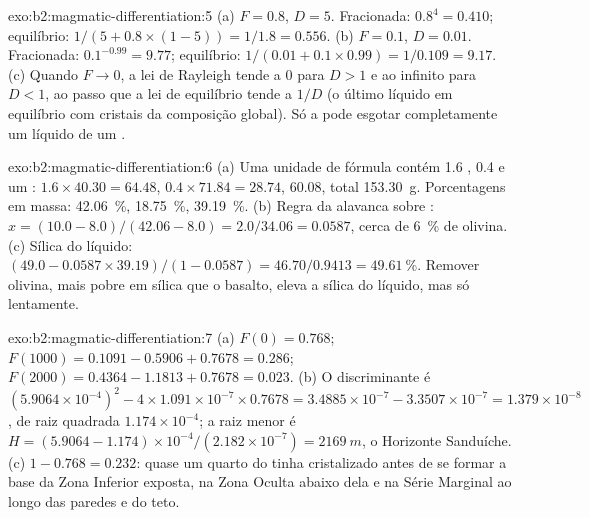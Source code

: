 \begin{solution}{exo:b2:magmatic-differentiation:5}
(a) $F = 0.8$, $D = 5$. Fracionada: $0.8^{4} = 0.410$; equilíbrio:
$1/(5 + 0.8\times(1 - 5)) = 1/1.8 = 0.556$. (b) $F = 0.1$, $D = 0.01$. Fracionada:
$0.1^{-0.99} = 9.77$; equilíbrio: $1/(0.01 + 0.1\times0.99) = 1/0.109 = 9.17$.
(c) Quando $F \to 0$, a lei de Rayleigh tende a $0$ para $D > 1$ e ao infinito para
$D < 1$, ao passo que a lei de equilíbrio tende a $1/D$ (o último líquido em equilíbrio
com cristais da composição global). Só a  pode esgotar completamente um
líquido de um .
\end{solution}

\begin{solution}{exo:b2:magmatic-differentiation:6}
(a) Uma unidade de fórmula contém 1.6 , 0.4  e um : $1.6\times
40.30 = 64.48$, $0.4\times71.84 = 28.74$, 60.08, total \qty{153.30}{g}. Porcentagens
em massa:  \qty{42.06}{\percent},  \qty{18.75}{\percent},
 \qty{39.19}{\percent}. (b) Regra da alavanca sobre : $x = (10.0 - 8.0)/(42.06
- 8.0) = 2.0/34.06 = 0.0587$, cerca de \qty{6}{\percent} de olivina. (c) Sílica do
líquido: $(49.0 - 0.0587\times39.19)/(1 - 0.0587) = 46.70/0.9413 =
\qty{49.61}{\percent}$. Remover olivina, mais pobre em sílica que o basalto, eleva a
sílica do líquido, mas só lentamente.
\end{solution}

\begin{solution}{exo:b2:magmatic-differentiation:7}
(a) $F(0) = 0.768$; $F(1000) = 0.1091 - 0.5906 + 0.7678 = 0.286$; $F(2000) = 0.4364
- 1.1813 + 0.7678 = 0.023$. (b) O discriminante é $(5.9064\times10^{-4})^2 -
4\times1.091\times10^{-7}\times0.7678 = 3.4885\times10^{-7} - 3.3507\times10^{-7} =
1.379\times10^{-8}$, de raiz quadrada $1.174\times10^{-4}$; a raiz menor é
$H = (5.9064 - 1.174)\times10^{-4}/(2.182\times10^{-7}) = \qty{2169}{m}$, o
Horizonte Sanduíche. (c) $1 - 0.768 = 0.232$: quase um quarto do  tinha
cristalizado antes de se formar a base da Zona Inferior exposta, na Zona Oculta
abaixo dela e na Série Marginal ao longo das paredes e do teto.
\end{solution}

